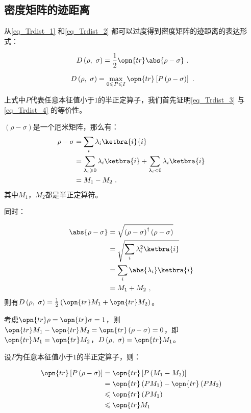 \subsection{密度矩阵的迹距离}

从\autoref{eq_Trdist_1} 和\autoref{eq_Trdist_2} 都可以过度得到密度矩阵的迹距离的表达形式：

\begin{equation}\label{eq_Trdist_4}
D\left(\rho,~\sigma\right) = \frac{1}{2} \opn{tr}\abs{\rho - \sigma}~.
\end{equation}

\begin{equation}\label{eq_Trdist_3}
D\left(\rho,~\sigma\right) = \max_{0\leqslant P \leqslant I} \opn{tr}\left[P\left(\rho - \sigma\right)\right]~.
\end{equation}

上式中$P$代表任意本征值小于$1$的半正定算子，我们首先证明\autoref{eq_Trdist_3} 与\autoref{eq_Trdist_4} 的等价性。

$\left(\rho - \sigma\right)$是一个厄米矩阵，那么有：
\begin{equation}
\begin{aligned}
\rho - \sigma &= \sum_i \lambda_i \ketbra{i}{i} \\
&= \sum_{\lambda_i \geqslant 0}\lambda_i \ketbra{i} + \sum_{\lambda_i<0}\lambda_i\ketbra{i} \\
&= M_1 - M_2~.
\end{aligned}~
\end{equation}
其中$M_1$，$M_2$都是半正定算符。

同时：

\begin{equation}
\begin{aligned}
\abs{\rho - \sigma} &= \sqrt{\left( \rho - \sigma \right)^\dagger \left( \rho - \sigma \right)} \\
&= \sqrt{\sum_i \lambda_i^2\ketbra{i}} \\
&= \sum_i\abs{\lambda_i}\ketbra{i} \\
&= M_1 + M_2~,
\end{aligned}~
\end{equation}
则有$D\left(\rho,~\sigma\right) = \frac{1}{2}\left(\opn{tr}M_1 + \opn{tr}M_2\right)$。

考虑$\opn{tr}\rho = \opn{tr}\sigma = 1$，则$\opn{tr}M_1 - \opn{tr}M_2 = \opn{tr}\left(\rho - \sigma\right) = 0$，即$\opn{tr}M_1 = \opn{tr}M_2$，$D\left(\rho,~\sigma\right) = \opn{tr}M_1$。

设$P$为任意本征值小于$1$的半正定算子，则：

\begin{equation}
\begin{aligned}
\opn{tr} \left[ P\left(\rho - \sigma\right) \right] &= \opn{tr}\left[ P\left(M_1 - M_2\right) \right] \\
&= \opn{tr}\left(PM_1\right) - \opn{tr}\left(PM_2\right) \\
&\leqslant \opn{tr}\left(PM_1\right) \\
&\leqslant \opn{tr}M_1
\end{aligned}~
\end{equation}



